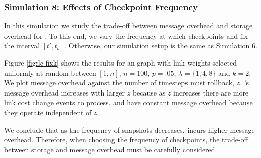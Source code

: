 \subsubsection{Simulation 8:  Effects of Checkpoint Frequency}

In this simulation we study the trade-off between message overhead and storage overhead for \cprs. To this end, we vary the frequency at which \cpr checkpoints and fix 
the interval $[t',t_b]$. Otherwise, our simulation setup is the same as Simulation 6.

Figure \ref{fig:lc-fixk} shows the results for an \er graph with link weights selected uniformly at random between $[1,n]$,
$n=100$, $p=.05$, $\lambda=\{1,4,8\}$ and $k=2$. We plot message overhead against the number of timesteps \cpr must rollback, $z$. \cprs's message overhead increases with larger $z$ 
because as $z$ increases there are more link cost change events to process. \second and \purge have constant message overhead because they operate independent of $z$.

We conclude that as the frequency of \cpr snapshots decreases, \cpr incurs higher message overhead.  Therefore, when choosing the frequency of checkpoints,
the trade-off between storage and message overhead must be carefully considered. 



